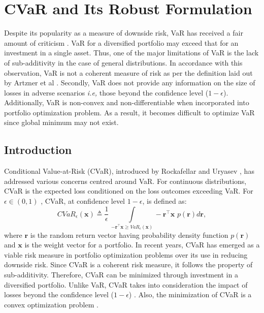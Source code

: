 \chapter{CVaR and Its Robust Formulation}

Despite its popularity as a measure of downside risk, VaR has received a fair amount of criticism \cite{capinski_risk,zhu,lim}. VaR for a diversified portfolio may exceed that for an investment in a single asset. Thus, one of the major limitations of VaR is the lack of sub-additivity in the case of general distributions. In accordance with this observation, VaR is not a coherent measure of risk as per the definition laid out by Artzner et al \cite{artzner}. Secondly, VaR does not provide any information on the size of losses in adverse scenarios \textit{i.e,} those beyond the confidence level ($1-\epsilon$). Additionally, VaR is non-convex and non-differentiable when incorporated into portfolio optimization problem. As a result, it becomes difficult to optimize VaR since global minimum may not exist. 

\section{Introduction}

Conditional Value-at-Risk (CVaR), introduced by Rockafellar and Uryasev \cite{rockafellar1,rockafellar2}, has addressed various concerns centred around VaR. For continuous distributions, CVaR is the expected loss conditioned on the loss outcomes exceeding VaR. For $\epsilon \in (0,1)$ , CVaR, at confidence level $1-\epsilon$, is defined as:
\begin{equation}
\label{eq:6.1}
CVaR_{\epsilon}(\mathbf{x}) \triangleq \frac{1}{\epsilon} \, \int \limits_{-\mathbf{r}^{\top}\mathbf{x} \geq VaR_{\epsilon}(\mathbf{x})} -\mathbf{r}^{\top}\mathbf{x} \, \, p(\mathbf{r})  d\mathbf{r},
\end{equation}
where $\mathbf{r}$ is the random return vector having probability density function $p(\mathbf{r})$ and $\mathbf{x}$ is the weight vector for a portfolio. In recent years, CVaR has emerged as a viable risk measure in portfolio optimization problems over its use in reducing downside risk. Since CVaR is a coherent risk measure, it follows the property of sub-additivity. Therefore, CVaR can be minimized through investment in a diversified portfolio. Unlike VaR, CVaR takes into consideration the impact of losses beyond the confidence level ($1-\epsilon$) \cite{capinski_risk}. Also, the minimization of CVaR is a convex optimization problem \cite{lim}.

